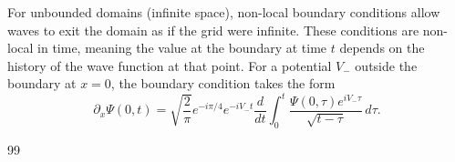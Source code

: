 \documentclass[11pt]{article}
\begin{document}
For unbounded domains (infinite space), non-local boundary conditions allow waves to exit the domain as if the grid were infinite. These conditions are non-local in time, meaning the value at the boundary at time $t$ depends on the history of the wave function at that point. For a potential $V_-$ outside the boundary at $x=0$, the boundary condition takes the form
\begin{equation}
	\partial_x \Psi(0,t) = \sqrt{\frac{2}{\pi}} e^{-i\pi/4} e^{-iV_- t} \frac{d}{dt} \int_0^t \frac{\Psi(0,\tau)e^{iV_- \tau}}{\sqrt{t-\tau}}\, d\tau.
\end{equation}



















\break
\begin{thebibliography}{99}

\end{thebibliography}	
\end{document}
